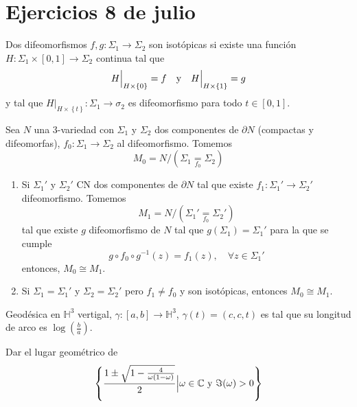 \documentclass[12pt]{report}
\theoremstyle{largebreak}
\newcommand\cf[3]{\ensuremath{#1:#2\rightarrow#3}}
\begin{document}
    \section{Ejercicios 8 de julio}

    \begin{mydef}
        Dos difeomorfismos $\cf{f,g}{\Sigma_1}{\Sigma_2}$ son isotópicas si existe una función $\cf{H}{\Sigma_1\times[0,1]}{\Sigma_2}$ continua tal que
        \begin{equation*}
            H\Big|_{ H\times\left\{0\right\}}=f\quad\textup{y}\quad H\Big|_{ H\times\left\{1\right\}}=g
        \end{equation*}
        y tal que $\cf{H\Big|_{ H\times\left\{t\right\}}}{\Sigma_1}{\sigma_2}$ es difeomorfismo para todo $t\in[0,1]$.
    \end{mydef}

    \begin{excer}
        Sea $N$ una $3$-variedad con $\Sigma_1$ y $\Sigma_2$ dos componentes de $\partial N$ (compactas y difeomorfas), $\cf{f_0}{\Sigma_1}{\Sigma_2}$ al difeomorfismo. Tomemos
        \begin{equation*}
            M_0=N/\left(\Sigma_1\underset{ f_0}{=}\Sigma_2\right)
        \end{equation*}
        \begin{enumerate}
            \item Si $\Sigma_1'$ y $\Sigma_2'$ CN dos componentes de $\partial N$ tal que existe $\cf{f_1}{\Sigma_1'}{\Sigma_2'}$ difeomorfismo. Tomemos
            \begin{equation*}
                M_1=N/\left(\Sigma_1'\underset{ f_0}{=}\Sigma_2'\right)
            \end{equation*}
            tal que existe $g$ difeomorfismo de $N$ tal que $g(\Sigma_1)=\Sigma_1'$ para la que se cumple
            \begin{equation*}
                g\circ f_0\circ g^{ -1}(z)=f_1(z),\quad\forall z\in\Sigma_1'
            \end{equation*}
            entonces, $M_0\cong M_1$.
            \item Si $\Sigma_1=\Sigma_1'$ y $\Sigma_2=\Sigma_2'$ pero $f_1\neq f_0$ y son isotópicas, entonces $M_0\cong M_1$.
        \end{enumerate}
    \end{excer}

    \begin{excer}
        Geodésica en $\mathbb{H}^3$ vertigal, $\cf{\gamma}{[a,b]}{\mathbb{H}^3}$, $\gamma(t)=(c,c,t)$ es tal que su longitud de arco es $\log\left(\frac{b}{a}\right)$.
    \end{excer}

    \begin{excer}
        Dar el lugar geométrico de
        \begin{equation*}
            \left\{\frac{1\pm\sqrt{1-\frac{4}{\omega(1-\omega)}}}{2}\Big|\omega\in\mathbb{C}\textup{ y }\Im(\omega)>0 \right\}
        \end{equation*}
    \end{excer}
\end{document}
